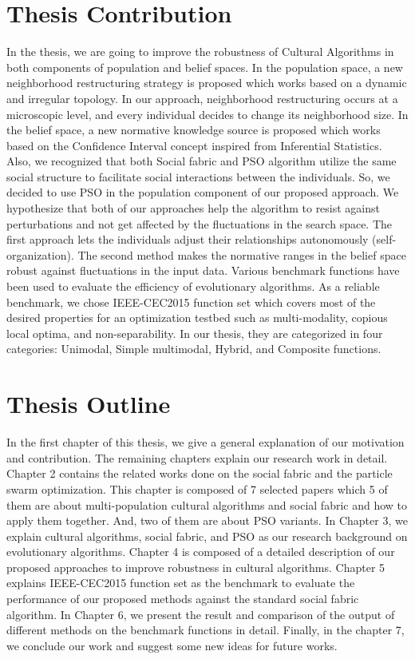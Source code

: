\section{Thesis Contribution}
In the thesis, we are going to improve the robustness of Cultural Algorithms in both components of population and belief spaces. In the population space, a new neighborhood restructuring strategy is proposed which works based on a dynamic and irregular topology. In our approach, neighborhood restructuring occurs at a microscopic level, and every individual decides to change its neighborhood size. In the belief space, a new normative knowledge source is proposed which works based on the Confidence Interval concept inspired from Inferential Statistics. Also, we recognized that both Social fabric and PSO algorithm utilize the same social structure to facilitate social interactions between the individuals. So, we decided to use PSO in the population component of our proposed approach. We hypothesize that both of our approaches help the algorithm to resist against perturbations and not get affected by the fluctuations in the search space. The first approach lets the individuals adjust their relationships autonomously (self-organization). The second method makes the normative ranges in the belief space robust against fluctuations in the input data. \newline Various benchmark functions have been used to evaluate the efficiency of evolutionary algorithms. As a reliable benchmark, we chose IEEE-CEC2015 function set which covers most of the desired properties for an optimization testbed such as multi-modality, copious local optima, and non-separability. In our thesis, they are categorized in four categories: Unimodal, Simple multimodal, Hybrid, and Composite functions.
\section{Thesis Outline}
In the first chapter of this thesis, we give a general explanation of our motivation and contribution. The remaining chapters explain our research work in detail. Chapter 2 contains the related works done on the social fabric and the particle swarm optimization. This chapter is composed of 7 selected papers which 5 of them are about multi-population cultural algorithms and social fabric and how to apply them together. And, two of them are about PSO variants. In Chapter 3, we explain cultural algorithms, social fabric, and PSO as our research background on evolutionary algorithms. Chapter 4 is composed of a detailed description of our proposed approaches to improve robustness in cultural algorithms. Chapter 5 explains IEEE-CEC2015 function set as the benchmark to evaluate the performance of our proposed methods against the standard social fabric algorithm. In Chapter 6, we present the result and comparison of the output of different methods on the benchmark functions in detail. Finally, in the chapter 7, we conclude our work and suggest some new ideas for future works.